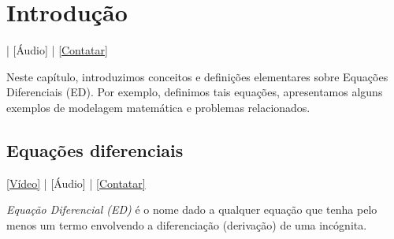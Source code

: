 
\chapter{Introdução}\label{cap_intro}
\thispagestyle{fancy}

\begin{flushright}
  [Vídeo] | [Áudio] | \href{https://phkonzen.github.io/notas/contato.html}{[Contatar]}
\end{flushright}

Neste capítulo, introduzimos conceitos e definições elementares sobre Equações Diferenciais (ED). Por exemplo, definimos tais equações, apresentamos alguns exemplos de modelagem matemática e problemas relacionados.

\section{Equações diferenciais}\label{cap_intro_sec_ed}

\begin{flushright}
  \href{https://archive.org/details/edo-introducao}{[Vídeo]} | [Áudio] | \href{https://phkonzen.github.io/notas/contato.html}{[Contatar]}
\end{flushright}

\emph{Equação Diferencial (ED)} é o nome dado a qualquer equação que tenha pelo menos um termo envolvendo a diferenciação (derivação) de uma incógnita.

